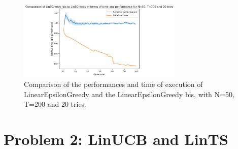 \begin{enumerate}
\begin{figure}[h]
    \centering
    \includegraphics[width=0.7\textwidth]{images/comparison.png}
    \caption{Comparison of the performances and time of execution of LinearEpsilonGreedy and the LinearEpsilonGreedy bis, with N=50, T=200 and 20 tries.} 
    \label{fig:lin_epsilon_greedy}
\end{figure}





\end{enumerate}


\section{Problem 2: LinUCB and LinTS}


